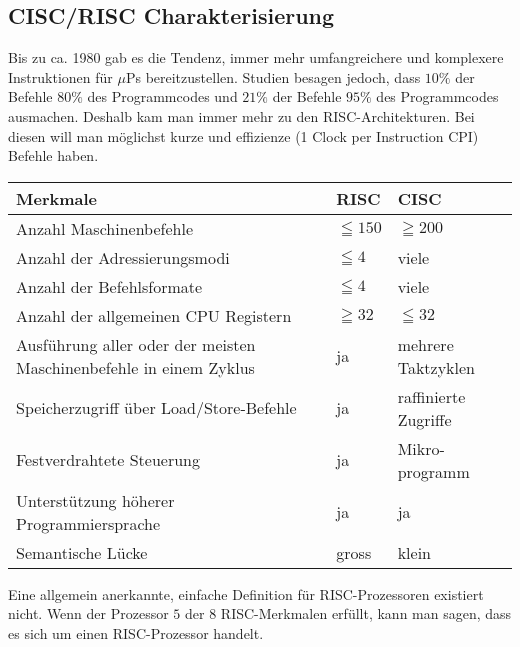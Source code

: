 \subsection{CISC/RISC Charakterisierung}

Bis zu ca. 1980 gab es die Tendenz, immer mehr umfangreichere und komplexere Instruktionen für $\mu$Ps bereitzustellen.
Studien besagen jedoch, dass $10\%$ der Befehle $80\%$ des Programmcodes und $21\%$ der Befehle $95\%$ des Programmcodes ausmachen.
Deshalb kam man immer mehr zu den RISC-Architekturen.
Bei diesen will man möglichst kurze und effizienze (1 Clock per Instruction CPI) Befehle haben.

\begin{table}[ht]
	\centering
	\begin{tabular}{ |p{10 cm} |p{2 cm}|p{4 cm}|}
		\hline				%
		\textbf{Merkmale} 	& 	\textbf{RISC}	& \textbf{CISC} \\
		\hline Anzahl Maschinenbefehle	& $\leqq 150$	& $\geqq 200$ \\
		Anzahl der Adressierungsmodi	& $\leqq 4$ 	& viele \\
		Anzahl der Befehlsformate 		& $\leqq 4$ 	& viele \\
		Anzahl der allgemeinen CPU Registern & $\geqq 32$ 	& $\leqq 32$ \\
		Ausführung aller oder der meisten Maschinenbefehle in einem Zyklus 		& ja 	& mehrere Taktzyklen \\	
		Speicherzugriff über Load/Store-Befehle & ja & raffinierte Zugriffe \\
		Festverdrahtete Steuerung		& ja	& Mikro-programm \\
		Unterstützung höherer Programmiersprache & ja 	& ja \\
		Semantische Lücke				& gross			& klein \\
		\hline
	\end{tabular} 

\end{table}
\vspace{-0.4cm}
Eine allgemein anerkannte, einfache Definition für RISC-Prozessoren existiert nicht.
Wenn der Prozessor $5$ der $8$ RISC-Merkmalen erfüllt, kann man sagen, dass es sich um einen RISC-Prozessor handelt. 


